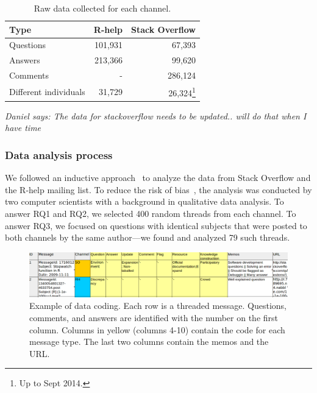 \documentclass[smallextended]{svjour3}       %
\newcommand{\dmg}[1]{{\color{blue}\emph{Daniel says: #1}}\xspace}
\newcommand{\dmg}[1]{}
\newcommand{\SO}{Stack Overflow\xspace}
\newcommand{\RH}{R-help\xspace}
\begin{document}
	\begin{table}[!htb]
	  \centering
      \caption{Raw data collected for each channel.}
      \begin{small}
        \begin{tabular}{lrr}
	        \toprule
	        Type          &  \RH & \SO \\
	        \midrule
	        Questions     & 101,931 &  67,393 \\
	        Answers       & 213,366 &  99,620 \\
	        Comments      &       - & 286,124 \\
          Different individuals & 31,729 &  26,324\footnote{Up to Sept
                                           2014.} \\
	        \bottomrule
        \end{tabular}
      \end{small}
	  \label{table:data}
	\end{table}

        \dmg{The data for stackoverflow needs to be updated.. will do that when I have time}

\subsubsection{Data analysis process}
\label{sec:dap}

We followed an inductive approach~\cite{Runeson2012} to analyze the data from \SO and the \RH mailing list. 
To reduce the risk of bias~\cite{Runeson2012}, the analysis was conducted by two computer scientists with a background in qualitative data analysis.
 To answer RQ1 and RQ2, we selected 400 random threads from each channel. To answer RQ3, we focused on questions with identical subjects that were posted to both channels by the same author---we found and analyzed 79 such threads.
    
    \begin{figure}[htbp]
    	\centering
    	\includegraphics[width=.95\textwidth]{../Figures/CodingExample}
    	\caption{Example of data coding. Each row is a threaded message. Questions, comments, and answers are identified with the number on the first column. Columns in yellow (columns 4-10) contain the code for each message type. The last two columns contain the memos and the URL.}
    	\label{fig:CodingExample}
    \end{figure}
\end{document}
